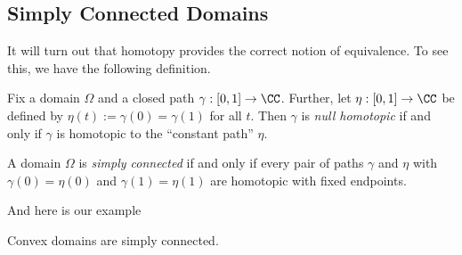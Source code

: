 \subsection{Simply Connected Domains}
It will turn out that homotopy provides the correct notion of equivalence. To see this, we have the following definition.
\begin{definition}
	Fix a domain $\Omega$ and a closed path $\gamma:[0,1]\to\CC$. Further, let $\eta:[0,1]\to\CC$ be defined by $\eta(t):=\gamma(0)=\gamma(1)$ for all $t$. Then $\gamma$ is \textit{null homotopic} if and only if $\gamma$ is homotopic to the ``constant path'' $\eta$.
\end{definition}
\begin{definition}
	A domain $\Omega$ is \textit{simply connected} if and only if every pair of paths $\gamma$ and $\eta$ with $\gamma(0)=\eta(0)$ and $\gamma(1)=\eta(1)$ are homotopic with fixed endpoints.
\end{definition}
And here is our example
\begin{lemma}
	Convex domains are simply connected.
\end{lemma}
